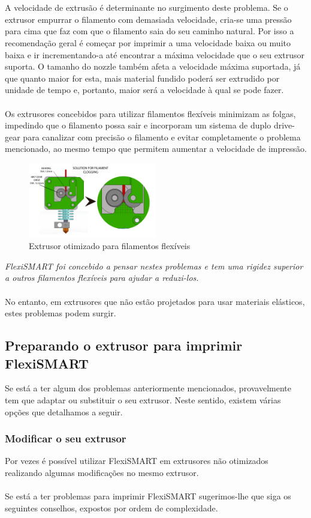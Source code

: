 \documentclass[11pt,a4paper]{article}
\begin{document}
\\\\
A velocidade de extrusão é determinante no surgimento deste problema. Se o extrusor empurrar o filamento com demasiada velocidade, cria-se uma pressão para cima que faz com que o filamento saia do seu caminho natural. Por isso a recomendação geral é começar por imprimir a uma velocidade baixa ou muito baixa e ir incrementando-a até encontrar a máxima velocidade que o seu extrusor suporta. O tamanho do nozzle também afeta a velocidade máxima suportada, já que quanto maior for esta, mais material fundido poderá ser extrudido por unidade de tempo e, portanto, maior será a velocidade à qual se pode fazer.
\\\\
Os extrusores concebidos para utilizar filamentos flexíveis minimizam as folgas, impedindo que o filamento possa sair e incorporam um sistema de duplo drive-gear para canalizar com precisão o filamento e evitar completamente o problema mencionado, ao mesmo tempo que permitem aumentar a velocidade de impressão.
\begin{figure}[H]
\centering
\includegraphics[width=0.5\textwidth,cfbox=azul_marcos 4pt 0pt]{FOTOS/NUDOS2}
\caption*{Extrusor otimizado para filamentos flexíveis}
\end{figure}
\emph{FlexiSMART foi concebido a pensar nestes problemas e tem uma rigidez superior a outros filamentos flexíveis para ajudar a reduzi-los.}
\\\\
No entanto, em extrusores que não estão projetados para usar materiais elásticos, estes problemas podem surgir.
	\subsection{Preparando o extrusor para imprimir FlexiSMART}Se está a ter algum dos problemas anteriormente mencionados, provavelmente tem que adaptar ou substituir o seu extrusor. Neste sentido, existem várias opções que detalhamos a seguir.
		\subsubsection{Modificar o seu extrusor}
Por vezes é possível utilizar FlexiSMART em extrusores não otimizados realizando algumas modificações no mesmo extrusor.
\\\\
Se está a ter problemas para imprimir FlexiSMART sugerimos-lhe que siga os seguintes conselhos, expostos por ordem de complexidade.
\end{document}
